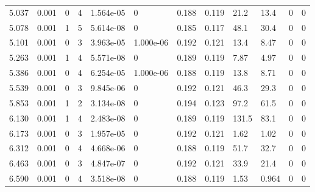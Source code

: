 \documentclass[preview]{standalone}
\begin{document}
{{\begin{tabular}{L{1.2cm}C{1.2cm} C{0.3cm}C{0.5cm} C{1.4cm}C{1.4cm} C{1.4cm}C{1.4cm} C{1.6cm}C{1.6cm} C{1.6cm}C{1.6cm}}
  5.037  &  0.001  & 0     &  4 &  1.564e-05  & 0  &  0.188&   0.119& 21.2 & 13.4   &  0 & 0  \\ 
  5.078  &  0.001  & 1     &  5 &  5.614e-08  & 0  &  0.185&   0.117& 48.1 & 30.4   &  0 & 0  \\ 
  5.101  &  0.001  & 0     &  3 &  3.963e-05  & 1.000e-06  &  0.192&   0.121& 13.4 & 8.47   &  0 & 0  \\ 
  5.263  &  0.001  & 1     &  4 &  5.571e-08  & 0  &  0.189&   0.119& 7.87 & 4.97   &  0 & 0  \\ 
  5.386  &  0.001  & 0     &  4 &  6.254e-05  & 1.000e-06  &  0.188&   0.119& 13.8 & 8.71   &  0 & 0  \\ 
  5.539  &  0.001  & 0     &  3 &  9.845e-06  & 0  &  0.192&   0.121& 46.3 & 29.3   &  0 & 0  \\ 
  5.853  &  0.001  & 1     &  2 &  3.134e-08  & 0  &  0.194&   0.123& 97.2 & 61.5   &  0 & 0  \\ 
  6.130  &  0.001  & 1     &  4 &  2.483e-08  & 0  &  0.189&   0.119& 131.5 & 83.1   &  0 & 0  \\ 
  6.173  &  0.001  & 0     &  3 &  1.957e-05  & 0  &  0.192&   0.121& 1.62 & 1.02   &  0 & 0  \\ 
  6.312  &  0.001  & 0     &  4 &  4.668e-06  & 0  &  0.188&   0.119& 51.7 & 32.7   &  0 & 0  \\ 
  6.463  &  0.001  & 0     &  3 &  4.847e-07  & 0  &  0.192&   0.121& 33.9 & 21.4   &  0 & 0  \\ 
  6.590  &  0.001  & 0     &  4 &  3.518e-08  & 0  &  0.188&   0.119& 1.53 & 0.964   &  0 & 0  \\ 
\hline 
\end{tabular} 

}}
\end{document}
